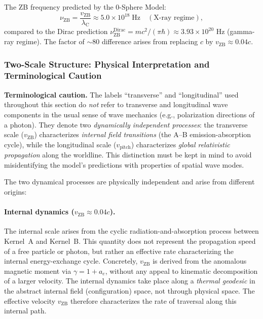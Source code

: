 \documentclass[12pt,letterpaper]{article}
\newcommand{\vZB}{v_{\mathrm{ZB}}}
\newcommand{\lambdaC}{\lambda_{\mathrm{C}}}
\begin{document}
\noindent The ZB frequency predicted by the 0-Sphere Model:
\begin{equation}
\nu_{\mathrm{ZB}} = \frac{\vZB}{\lambdaC} \approx 5.0\times10^{18}\;\mathrm{Hz}
\quad (\text{X-ray regime}),
\end{equation}
compared to the Dirac prediction $\nu_{\mathrm{ZB}}^{\mathrm{Dirac}} = mc^2/(\pi\hbar)
\approx 3.93\times10^{20}$ Hz (gamma-ray regime).
The factor of $\sim 80$ difference arises from replacing $c$ by $\vZB\approx 0.04c$.

\subsubsection{Two-Scale Structure: Physical Interpretation and Terminological Caution}
\label{subsubsec:two_scale}

\begin{mdframed}[style=purplebox]
\textbf{Terminological caution.}
The labels ``transverse'' and ``longitudinal'' used throughout this section
do \emph{not} refer to transverse and longitudinal wave components in the usual
sense of wave mechanics (e.g., polarization directions of a photon).
They denote two \emph{dynamically independent processes}:
the transverse scale ($\vZB$) characterizes \emph{internal field transitions}
(the A--B emission-absorption cycle),
while the longitudinal scale ($v_{\mathrm{pitch}}$) characterizes
\emph{global relativistic propagation} along the worldline.
This distinction must be kept in mind to avoid misidentifying the model's
predictions with properties of spatial wave modes.
\end{mdframed}

The two dynamical processes are physically independent and arise from different origins:

\paragraph{Internal dynamics ($\vZB \approx 0.04c$).}
The internal scale arises from the cyclic radiation-and-absorption process between
Kernel~A and Kernel~B. This quantity does not represent the propagation speed of a
free particle or photon, but rather an effective rate characterizing the
internal energy-exchange cycle. Concretely, $\vZB$ is derived from the anomalous
magnetic moment via $\gamma = 1 + a_e$, without any appeal to kinematic decomposition
of a larger velocity. The internal dynamics take place along a \emph{thermal geodesic}
in the abstract internal field (configuration) space, not through physical space.
The effective velocity $\vZB$ therefore characterizes the rate of traversal along
this internal path.
\end{document}

